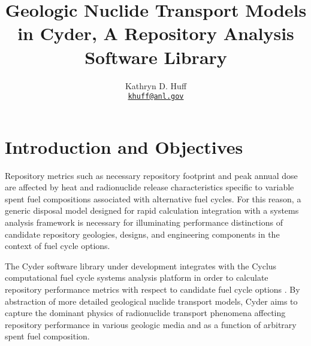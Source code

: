 \documentclass[letterpaper]{article}
\author{Kathryn D. Huff
\\ \href{mailto:khuff@anl.gov}{\texttt{khuff@anl.gov}}
}
\date{}
\title{Geologic Nuclide Transport Models in Cyder, A Repository Analysis Software Library}
\begin{document}
\maketitle









\section{Introduction and Objectives}

Repository metrics such as necessary repository footprint and peak annual dose 
are affected by heat and radionuclide release characteristics specific to 
variable spent fuel compositions associated with alternative fuel cycles.  For 
this reason, a generic disposal model designed for rapid calculation integration 
with a systems analysis framework is necessary for illuminating performance 
distinctions of candidate repository geologies, designs, and engineering 
components in the context of fuel cycle options. 

The Cyder software library under development integrates with 
the Cyclus computational fuel cycle systems analysis platform in order to 
calculate repository performance metrics with respect to candidate fuel cycle 
options \cite{huff_cyder_2012,huff_cyclus:_2010}. By abstraction of more 
detailed geological nuclide transport models, Cyder aims to capture the dominant 
physics of radionuclide transport phenomena affecting repository performance in 
various geologic media and as a function of arbitrary spent fuel composition.
\end{document}
